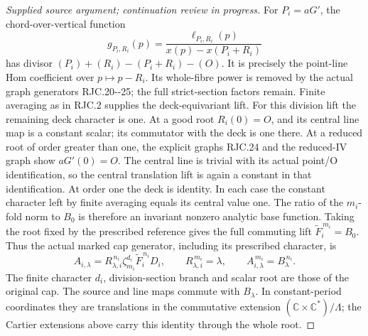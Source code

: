 \begin{proof}[Supplied source argument; continuation review in progress]
For \(P_i=aG'\), the chord-over-vertical function
\[
 g_{P_i,R_i}(p)=
 \frac{\ell_{P_i,R_i}(p)}{x(p)-x(P_i+R_i)}
 \tag{RJC.32}
\]
has divisor \((P_i)+(R_i)-(P_i+R_i)-(O)\).
It is precisely the point-line Hom coefficient over \(p\mapsto
p-R_i\). Its whole-fibre power is removed by the actual graph
generators RJC.20-\/-25; the full strict-section factors remain.
Finite averaging as in RJC.2 supplies the deck-equivariant lift.
For this division lift the remaining deck character is one.
At a good root \(R_i(0)=O\), and its central line map is a
constant scalar; its commutator with the deck is one there.
At a reduced root of order greater than one, the explicit
graphs RJC.24 and the reduced-IV graph show \(aG'(0)=O\).
The central line is trivial with its actual point/O
identification, so the central translation lift is again
a constant in that identification. At order one the deck
is identity. In each case the constant character left by
finite averaging equals its central value one.
The ratio of the \(m_i\)-fold norm to \(B_0\) is therefore an
invariant nonzero analytic base function. Taking the root fixed
by the prescribed reference gives the full commuting lift
\(\widetilde F_i^{\,m_i}=B_0\). Thus the
actual marked cap generator, including its prescribed character,
is
\[
 A_{i,\lambda}=R_{\lambda,i}^{\,n_i}
 \zeta_{m_i}^{d_i}\widetilde F_i^{\,n_i}D_i,\qquad
 R_{\lambda,i}^{\,m_i}=\lambda,\qquad
 A_{i,\lambda}^{\,m_i}=B_\lambda^{\,n_i}.
 \tag{RJC.33}
\]
The finite character \(d_i\), division-section branch and scalar
root are those of the original cap. The source and line maps
commute with \(B_\lambda\). In constant-period coordinates they
are translations in the commutative extension
\((\mathbb C\times\mathbb C^*)/\Lambda\); the Cartier extensions
above carry this identity through the whole root.


\end{proof}
